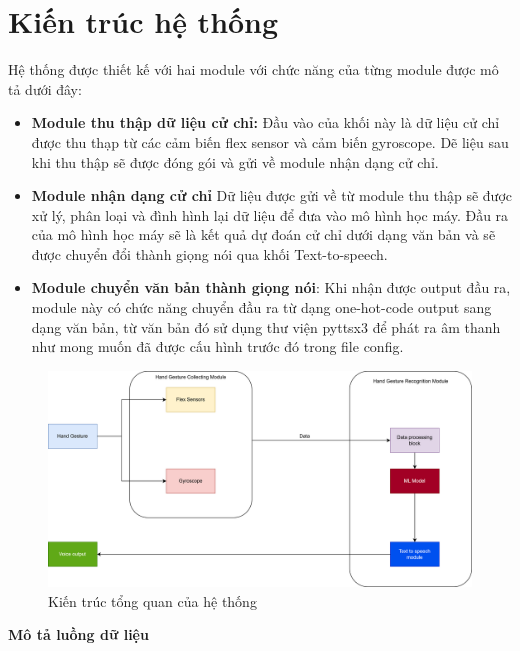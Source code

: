 \section{Kiến trúc hệ thống}
Hệ thống được thiết kế với hai module với chức năng của từng module được mô tả dưới đây:
\begin{itemize}
    \item \textbf{Module thu thập dữ liệu cử chỉ:} Đầu vào của khối này là dữ liệu cử chỉ được thu thạp từ các cảm biến flex sensor và cảm biến gyroscope. Dẽ liệu sau khi thu thập sẽ được đóng gói và gửi về module nhận dạng cử chỉ.
    \item \textbf{Module nhận dạng cử chỉ} Dữ liệu được gửi về từ module thu thập sẽ được xử lý, phân loại và đình hình lại dữ liệu để đưa vào mô hình học máy. Đầu ra của mô hình học máy sẽ là kết quả dự đoán cử chỉ dưới dạng văn bản và sẽ được chuyển đổi thành giọng nói qua khối Text-to-speech.
    \item \textbf{Module chuyển văn bản thành giọng nói}: Khi nhận được output đầu ra, module này có chức năng chuyển đầu ra từ dạng one-hot-code output sang dạng văn bản, từ văn bản đó sử dụng thư viện pyttsx3 để phát ra âm thanh như mong muốn đã được cấu hình trước đó trong file config.
\end{itemize}
\begin{figure}[H]
    \centering
    \includegraphics[width=\textwidth,height=\textheight,keepaspectratio]{Images/Theoretical basis/FlexArchitechture.png}
    \caption{Kiến trúc tổng quan của hệ thống}
    \label{fig:enter-label}
\end{figure}
\textbf{Mô tả luồng dữ liệu}
